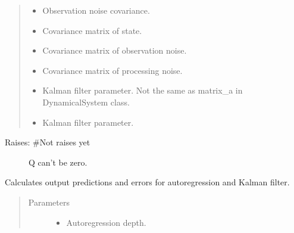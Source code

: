 \documentclass[letterpaper,10pt,english]{sphinxmanual}
\begin{document}
\begin{fulllineitems}
\begin{fulllineitems}
\begin{quote}
\begin{description}
\begin{itemize}
\item {} 
\sphinxAtStartPar
{} \textendash{} Observation noise covariance.

\item {} 
\sphinxAtStartPar
{} \textendash{} Covariance matrix of state.

\item {} 
\sphinxAtStartPar
{} \textendash{} Covariance matrix of observation noise.

\item {} 
\sphinxAtStartPar
{} \textendash{} Covariance matrix of processing noise.

\item {} 
\sphinxAtStartPar
{} \textendash{} Kalman filter parameter. Not the same as matrix\_a in DynamicalSystem class.

\item {} 
\sphinxAtStartPar
{} \textendash{} Kalman filter parameter.

\end{itemize}

\end{description}\end{quote}
\begin{description}
\item[{Raises:  \#Not raises yet}] \leavevmode
\sphinxAtStartPar
Q can’t be zero.

\end{description}

\end{fulllineitems}


\begin{fulllineitems}
\label{\detokenize{LDS.LDS.filters:LDS.LDS.filters.kalman_filtering_siso.KalmanFilteringSISO.predict}}
\sphinxAtStartPar
Calculates output predictions and errors for auto\sphinxhyphen{}regression and Kalman filter.
\begin{quote}\begin{description}
\item[{Parameters}] \leavevmode\begin{itemize}
\item {} 
\sphinxAtStartPar
{} \textendash{} Auto\sphinxhyphen{}regression depth.


\end{itemize}
\end{description}
\end{quote}
\end{fulllineitems}
\end{fulllineitems}
\end{document}

